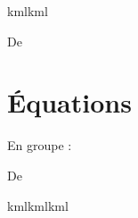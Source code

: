 
kmlkml


De \cite{NRHooXFvgpp4}


\section{Équations}

En groupe :



De \cite{NRHooXFvgpp4}

kmlkmlkml




